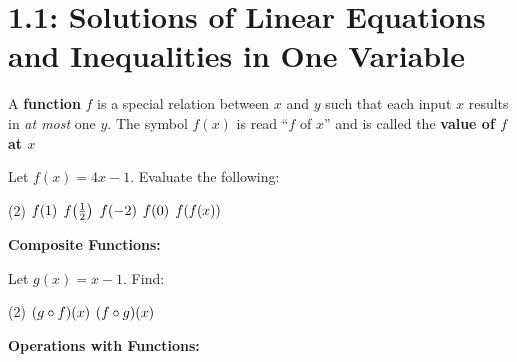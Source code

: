 \documentclass[../mathNotesPreamble]{subfiles}
\begin{document}
  \section{1.1: Solutions of Linear Equations and Inequalities in One Variable}
  \begin{defn*}
    A \textbf{function} $f$ is a special relation between $x$ and $y$ such that each input $x$ results in \emph{at most} one $y$. The symbol $f(x)$ is read ``$f$ of $x$'' and is called the \textbf{value of $f$ at $x$}
  \end{defn*}
  \vspace*{0\baselineskip}
  \begin{ex*}
    Let $f(x)=4x-1$. Evaluate the following:
    \begin{extasks}[after-item-skip=\stretch{1}](2)
      \task $f{\left(1\right)}$
      \task $f{\left(\frac{1}{2}\right)}$
      \task $f{\left(-2\right)}$
      \task $f{\left(0\right)}$
      \task $f{\left(f(x)\right)}$
    \end{extasks}
  \end{ex*}

  \noindent\textbf{Composite Functions:}

  \noindent{}
  \begin{ex*}
    Let $g(x)=x-1$. Find:
    \begin{extasks}[after-item-skip=\stretch{1}](2)
      \task ${\left(g\circ f\right)}(x)$
      \task ${\left(f\circ g\right)}(x)$
    \end{extasks}
  \end{ex*}

  \pagebreak
  \noindent\textbf{Operations with Functions:}

  \noindent{}
\end{document}

